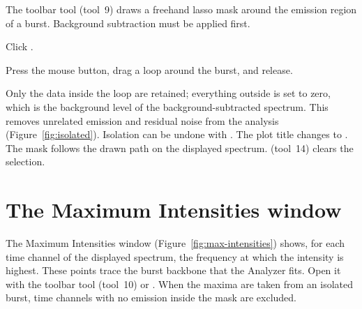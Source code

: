 The  toolbar tool (tool~9) draws a freehand lasso mask around the
emission region of a burst. Background subtraction must be applied first.
\begin{steps}
  \item Click .
  \item Press the mouse button, drag a loop around the burst, and release.
\end{steps}
Only the data inside the loop are retained; everything outside is set to zero, which is the
background level of the background-subtracted spectrum. This removes unrelated emission and
residual noise from the analysis (Figure~\ref{fig:isolated}). Isolation can be undone with
. The plot
title changes to . The mask follows the drawn path on the displayed
spectrum.  (tool~14) clears the selection.


\section{The Maximum Intensities window}
\label{sec:max-intensities}

The Maximum Intensities window (Figure~\ref{fig:max-intensities}) shows, for each time
channel of the displayed spectrum, the frequency at which the intensity is highest. These
points trace the burst backbone that the Analyzer fits. Open it with the
 toolbar tool (tool~10) or
. When the maxima are taken
from an isolated burst, time channels with no emission inside the mask are excluded.


